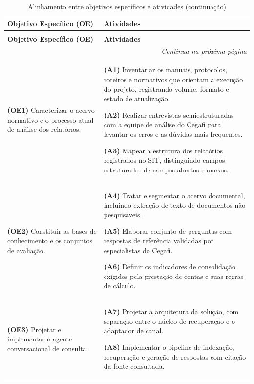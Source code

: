 {\small
\renewcommand{\arraystretch}{1.15}
\begin{longtable}{|p{}|p{}|}
\caption{Alinhamento entre objetivos específicos e atividades}
\label{tab:alinhamento-objetivos-atividades} \\
\hline
\textbf{Objetivo Específico (OE)} & \textbf{Atividades} \\
\hline
\endfirsthead

\caption[]{Alinhamento entre objetivos específicos e atividades (continuação)} \\
\hline
\textbf{Objetivo Específico (OE)} & \textbf{Atividades} \\
\hline
\endhead

\hline
\multicolumn{2}{r}{\textit{Continua na próxima página}} \\
\endfoot

\hline
\endlastfoot

\textbf{(OE1)} Caracterizar o acervo normativo e o processo atual de análise
dos relatórios.
& \textbf{(A1)} Inventariar os manuais, protocolos, roteiros e normativos que
orientam a execução do projeto, registrando volume, formato e estado de
atualização.

\smallskip
\textbf{(A2)} Realizar entrevistas semiestruturadas com a equipe de análise do
Cegafi para levantar os erros e as dúvidas mais frequentes.

\smallskip
\textbf{(A3)} Mapear a estrutura dos relatórios registrados no SIT,
distinguindo campos estruturados de campos abertos e anexos. \\
\hline

\textbf{(OE2)} Constituir as bases de conhecimento e os conjuntos de avaliação.
& \textbf{(A4)} Tratar e segmentar o acervo documental, incluindo extração de
texto de documentos não pesquisáveis.

\smallskip
\textbf{(A5)} Elaborar conjunto de perguntas com respostas de referência
validadas por especialistas do Cegafi.

\smallskip
\textbf{(A6)} Definir os indicadores de consolidação exigidos pela prestação de
contas e suas regras de cálculo. \\
\hline

\textbf{(OE3)} Projetar e implementar o agente conversacional de consulta.
& \textbf{(A7)} Projetar a arquitetura da solução, com separação entre o núcleo
de recuperação e o adaptador de canal.

\smallskip
\textbf{(A8)} Implementar o pipeline de indexação, recuperação e geração de
respostas com citação da fonte consultada.


\end{longtable}}

